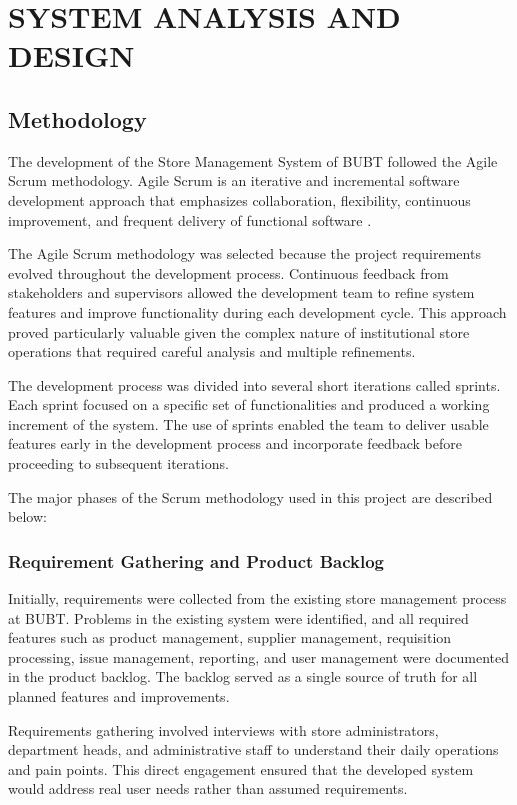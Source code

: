 \chapter{SYSTEM ANALYSIS AND DESIGN}
\label{chap:analysis}

\section{Methodology}

The development of the Store Management System of BUBT followed the Agile Scrum methodology. Agile Scrum is an iterative and incremental software development approach that emphasizes collaboration, flexibility, continuous improvement, and frequent delivery of functional software \cite{agile_methodology}.

The Agile Scrum methodology was selected because the project requirements evolved throughout the development process. Continuous feedback from stakeholders and supervisors allowed the development team to refine system features and improve functionality during each development cycle. This approach proved particularly valuable given the complex nature of institutional store operations that required careful analysis and multiple refinements.

The development process was divided into several short iterations called sprints. Each sprint focused on a specific set of functionalities and produced a working increment of the system. The use of sprints enabled the team to deliver usable features early in the development process and incorporate feedback before proceeding to subsequent iterations.

The major phases of the Scrum methodology used in this project are described below:

\subsection{Requirement Gathering and Product Backlog}

Initially, requirements were collected from the existing store management process at BUBT. Problems in the existing system were identified, and all required features such as product management, supplier management, requisition processing, issue management, reporting, and user management were documented in the product backlog. The backlog served as a single source of truth for all planned features and improvements.

Requirements gathering involved interviews with store administrators, department heads, and administrative staff to understand their daily operations and pain points. This direct engagement ensured that the developed system would address real user needs rather than assumed requirements.

